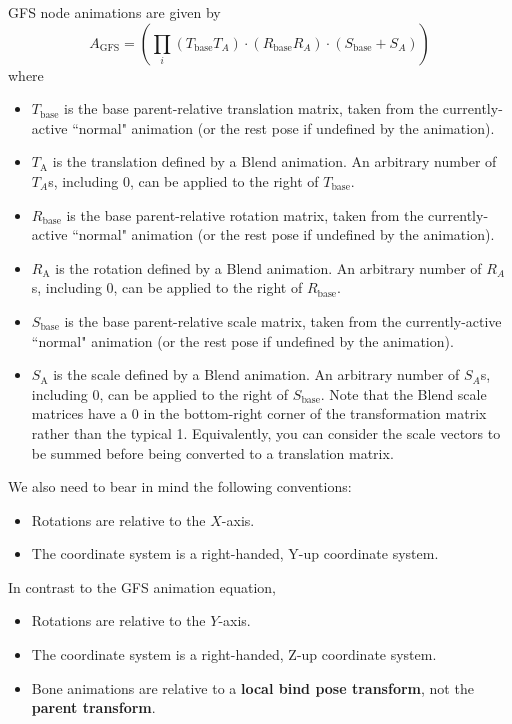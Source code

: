 \documentclass{article}
\begin{document}
GFS node animations are given by
\begin{equation}
A_\mathrm{GFS}  = \left( \prod_i \left(T_\mathrm{base} T_A\right) \cdot \left(R_\mathrm{base} R_A\right) \cdot \left(S_\mathrm{base} + S_A\right) \right)
\end{equation}
where
\begin{itemize}
\item $T_\mathrm{base}$ is the base parent-relative translation matrix, taken from the currently-active ``normal" animation (or the rest pose if undefined by the animation).
\item $T_\mathrm{A}$ is the translation defined by a Blend animation. An arbitrary number of $T_A$s, including 0, can be applied to the right of $T_\mathrm{base}$.
\item $R_\mathrm{base}$ is the base parent-relative rotation matrix, taken from the currently-active ``normal" animation (or the rest pose if undefined by the animation).
\item $R_\mathrm{A}$ is the rotation defined by a Blend animation. An arbitrary number of $R_A$s, including 0, can be applied to the right of $R_\mathrm{base}$.
\item $S_\mathrm{base}$ is the base parent-relative scale matrix, taken from the currently-active ``normal" animation (or the rest pose if undefined by the animation).
\item $S_\mathrm{A}$ is the scale defined by a Blend animation. An arbitrary number of $S_A$s, including 0, can be applied to the right of $S_\mathrm{base}$. Note that the Blend scale matrices have a 0 in the bottom-right corner of the transformation matrix rather than the typical 1. Equivalently, you can consider the scale vectors to be summed before being converted to a translation matrix.
\end{itemize}
We also need to bear in mind the following conventions:
\begin{itemize}
\item Rotations are relative to the $X$-axis.
\item The coordinate system is a right-handed, Y-up coordinate system.
\end{itemize}
In contrast to the GFS animation equation,
\begin{itemize}
\item Rotations are relative to the $Y$-axis.
\item The coordinate system is a right-handed, Z-up coordinate system.
\item Bone animations are relative to a \textbf{local bind pose transform}, not the \textbf{parent transform}.
\end{itemize}
\end{document}
